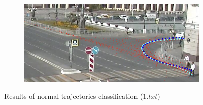 \begin{figure}[!htb]
\begin{subfigure}[!htb]{0.485\textwidth}
		\caption{}
	\end{subfigure}
	\hfill
	\begin{subfigure}[!htb]{0.485\textwidth}
		\centering{}
		\includegraphics[width=\textwidth]{images/classif-res/classif-norm-res-1-4.jpeg}
		\caption{}
	\end{subfigure}
	
	\caption{Results of normal trajectories classification ($1.txt$)}
	\label{fig:classif-norm-res-1}
\end{figure}

